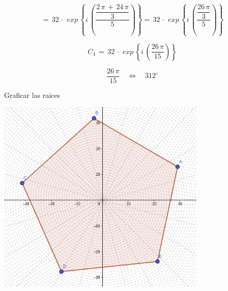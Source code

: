 \documentclass[a4paper,11pt,openany]{book}
\begin{document}
$$=\,32\,\cdot\,\,exp\,\left\{i\,\left(\dfrac{\dfrac{2\,\pi\,+\,24\,\pi}{3}}{5}\right)\right\}=\,32\,\cdot\,\,exp\,\left\{i\,\left(\dfrac{\dfrac{26\,\pi}{3}}{5}\right)\right\}$$

$$C_{4}\,=\,32\,\cdot\,\,exp\,\left\{i\,\left(\dfrac{26\,\pi}{15}\right)\right\}$$

$$\dfrac{26\,\pi}{15} \quad\iff\quad 312^\circ$$

\textcolor{ao(english)}{} Graficar las raices

\begin{center}
    \includegraphics[width=10cm]{Gra-Ej-12.png}
\end{center}
\end{document}
